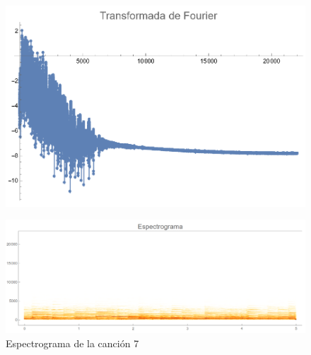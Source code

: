 \documentclass[12pt, letterpaper]{article}
\begin{document}
\begin{figure}[H]
  \centering
  \begin{minipage}{.4\linewidth}
    \centering
    \includegraphics[width=\linewidth]{imgs/Cancion7/transformada.png}
    \label{fig:07a}
  \end{minipage}
  \begin{minipage}{0.07\textwidth}\end{minipage}
  \begin{minipage}{.47\linewidth}
    \centering
    \includegraphics[width=\linewidth]{imgs/Cancion7/espectrograma.png}
    \caption{Espectrograma de la canción 7}
    \label{fig:07i}
  \end{minipage}
\end{figure}
\end{document}
